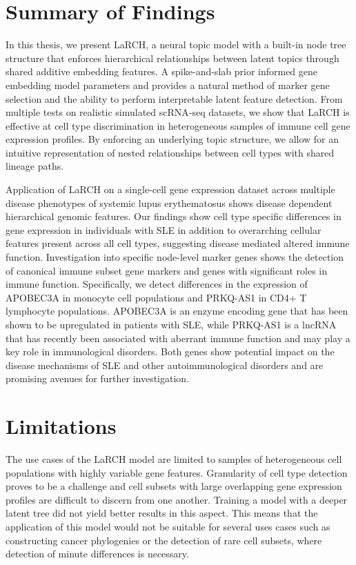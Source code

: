 \section{Summary of Findings}
In this thesis, we present LaRCH, a neural topic model with a built-in node tree structure that enforces hierarchical relationships between latent topics through shared additive embedding features. A spike-and-slab prior informed gene embedding model parameters and provides a natural method of marker gene selection and the ability to perform interpretable latent feature detection. From multiple tests on realistic simulated scRNA-seq datasets, we show that LaRCH is effective at cell type discrimination in heterogeneous samples of immune cell gene expression profiles. By enforcing an underlying topic structure, we allow for an intuitive representation of nested relationships between cell types with shared lineage paths. 

Application of LaRCH on a single-cell gene expression dataset across multiple disease phenotypes of systemic lupus erythematosus shows disease dependent hierarchical genomic features. Our findings show cell type specific differences in gene expression in individuals with SLE in addition to overarching cellular features present across all cell types, suggesting disease mediated altered immune function. Investigation into specific node-level marker genes shows the detection of canonical immune subset gene markers and genes with significant roles in immune function. Specifically, we detect differences in the expression of APOBEC3A in monocyte cell populations and PRKQ-AS1 in CD4+ T lymphocyte populations. APOBEC3A is an enzyme encoding gene that has been shown to be upregulated in patients with SLE, while PRKQ-AS1 is a lncRNA that has recently been associated with aberrant immune function and may play a key role in immunological disorders. Both genes show potential impact on the disease mechanisms of SLE and other autoimmunological disorders and are promising avenues for further investigation.

\section{Limitations}

The use cases of the LaRCH model are limited to samples of heterogeneous cell populations with highly variable gene features. Granularity of cell type detection proves to be a challenge and cell subsets with large overlapping gene expression profiles are difficult to discern from one another. Training a model with a deeper latent tree did not yield better results in this aspect. This means that the application of this model would not be suitable for several uses cases such as constructing cancer phylogenies or the detection of rare cell subsets, where detection of minute differences is necessary.
 
